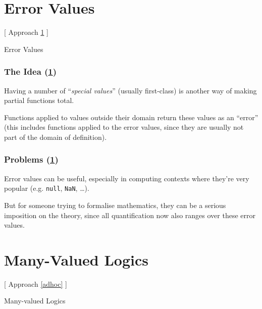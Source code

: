 \documentclass[aspectratio=169, usenames, dvipsnames]{beamer}
\begin{document}
\section{Error Values} \label{errorValues}

\begin{frame}
\begin{center}
\Large [ Approach \ref{errorValues} ]\bigskip

Error Values
\end{center}
\normalsize
\end{frame}

\begin{frame}
\frametitle{The Idea (\ref{errorValues})}

Having a number of ``\emph{special values}'' (usually first-class) is another way of making partial functions total.
\bigskip

Functions applied to values outside their domain return these values as an ``error'' (this includes functions applied to the error values, since they are usually not part of the domain of definition).
\end{frame}

\begin{frame}
\frametitle{Problems (\ref{errorValues})}

Error values can be useful, especially in computing contexts where they're very popular (e.g. \texttt{null}, \texttt{NaN}, \dots). 
\bigskip

But for someone trying to formalise mathematics, they can be a serious imposition on the theory, since all quantification now also ranges over these error values.
\end{frame}

\section{Many-Valued Logics}\label{manyval}

\begin{frame}
\begin{center}
\Large [ Approach \ref{adhoc} ]\bigskip

Many-valued Logics
\normalsize
\end{center}
\end{frame}
\end{document}
